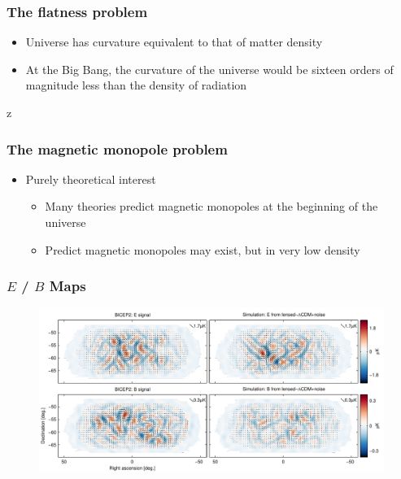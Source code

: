\documentclass[]{beamer}
\begin{document}
\begin{frame}
  \frametitle{The flatness problem}
  \begin{itemize}
  \item Universe has curvature equivalent to that of matter density
  \item At the Big Bang, the curvature of the universe would be sixteen orders
    of magnitude less than the density  of radiation
  \end{itemize}z

\end{frame}

\begin{frame}
  \frametitle{The magnetic monopole problem}
  \begin{itemize}
  \item Purely theoretical interest
    \begin{itemize}
    \item Many theories predict magnetic monopoles at the beginning of the
      universe
      \item Predict magnetic monopoles may exist, but in very low density
    \end{itemize}

  \end{itemize}
\end{frame}


\begin{frame}
  \frametitle{$E$ / $B$ Maps}
  \begin{figure}
    \centering
    \includegraphics[width=\columnwidth]{eb_maps}
  \end{figure}
\end{frame}
\end{document}
